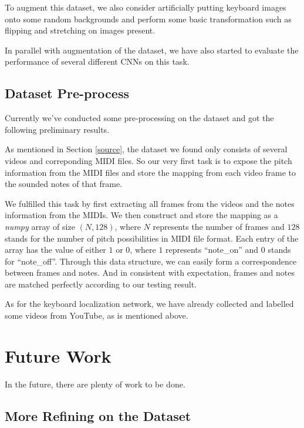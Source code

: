 \documentclass[10pt,twocolumn,letterpaper]{article}
\begin{document}
To augment this dataset, we also consider artificially putting keyboard images onto some random backgrounds and perform some basic transformation such as flipping and stretching on images present.

In parallel with augmentation of the dataset, we have also started to evaluate the performance of several different CNNs on this task.

\subsection{Dataset Pre-process}

Currently we've conducted some pre-processing on the dataset and got the following preliminary results.

As mentioned in Section \ref{source}, the dataset we found only consists of several videos and correponding MIDI files. 
So our very first task is to expose the pitch information from the MIDI files and store the mapping from each video frame to the sounded notes of that frame.

We fulfilled this task by first extracting all frames from the videos and the notes information from the MIDIs. We then construct and store the mapping as a \textit{numpy} array of size $(N, 128)$, where $N$ represents the number of frames and $128$ stands for the number of pitch possibilities in MIDI file format.
Each entry of the array has the value of either $1$ or $0$, where $1$ represents ``note\_on'' and $0$ stands for ``note\_off''. Through this data structure, we can easily form a correspondence between frames and notes. And in consistent with expectation, frames and notes are matched perfectly according to our testing result.

As for the keyboard localization network, we have already collected and labelled some videos from YouTube, as is mentioned above.

\section{Future Work}
In the future, there are plenty of work to be done.

\subsection{More Refining on the Dataset}
\label{result}
\end{document}
